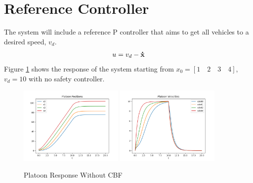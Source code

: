 \section{Reference Controller}
\noindent The system will include a reference P controller that aims to get all vehicles to a desired speed, $v_d$.
\begin{align} \label{eqn:platoon_reference}
    u = v_d - {\mathbf{\dot{x}}}
\end{align}
\noindent Figure \ref{fig:platoon_no_cbf} shows the response of the system starting from $x_0 = [1 \quad 2 \quad 3 \quad 4]$, $v_d = 10$ with no safety controller.

\begin{figure}[H]
    \centering
    \includegraphics[width=0.45\textwidth]{Figures/Examples/Platoon/NoPositions.png}
    \includegraphics[width=0.45\textwidth]{Figures/Examples/Platoon/NoVelocities.png}
    \caption{Platoon Response Without CBF}
    \label{fig:platoon_no_cbf}
\end{figure}

